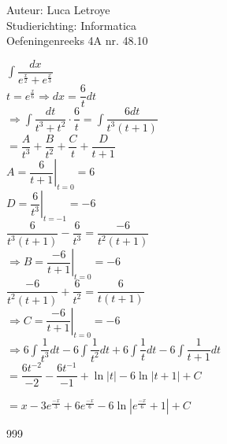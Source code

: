\documentclass[a4paper]{article}
\newcommand{\dint}{\displaystyle\int}
\begin{document}
  
\noindent \large Auteur: Luca Letroye \\
\noindent \large Studierichting: Informatica\\
\noindent \large Oefeningenreeks 4A nr. 48.10

\medskip
\normalsize

$\dint\dfrac{dx}{e^{\tfrac{x}{2}}+e^{\tfrac{x}{3}}}$\\

$t = e^{\tfrac{x}{6}} \Rightarrow dx=\dfrac{6}{t}dt$\\

$\Rightarrow \dint\dfrac{dt}{t^3+t^2}\cdot\dfrac{6}{t} = \dint\dfrac{6dt}{t^3(t+1)}$\\

$ = \dfrac{A}{t^3}+\dfrac{B}{t^2} + \dfrac{C}{t} + \dfrac{D}{t+1}$\\

$A = \left. \dfrac{6}{t+1}\right|_{t=0} = 6$\\

$D = \left. \dfrac{6}{t^3}\right|_{t=-1} = -6$\\

$\dfrac{6}{t^3(t+1)} -\dfrac{6}{t^3} = \dfrac{-6}{t^2(t+1)}$\\

$\Rightarrow B = \left. \dfrac{-6}{t+1}\right|_{t=0} = -6$\\

$\dfrac{-6}{t^2(t+1)} +\dfrac{6}{t^2} = \dfrac{6}{t(t+1)}$\\

$\Rightarrow C = \left. \dfrac{-6}{t+1}\right|_{t=0} = -6$\\

$\Rightarrow 6\dint\dfrac{1}{t^3}dt - 6\dint\dfrac{1}{t^2}dt +6\dint\dfrac{1}{t}dt -6\dint\dfrac{1}{t+1}dt$\\

$ = \dfrac{6t^{-2}}{-2} - \dfrac{6t^{-1}}{-1} +\ln|t| - 6\ln|t+1| +C$

$ = x-3e^{\tfrac{-x}{3}}+6e^{\tfrac{-x}{6}}-6\ln|e^{\tfrac{-x}{6}}+1|+C$\\






\begin{thebibliography}{999}
\end{thebibliography}
\end{document}
